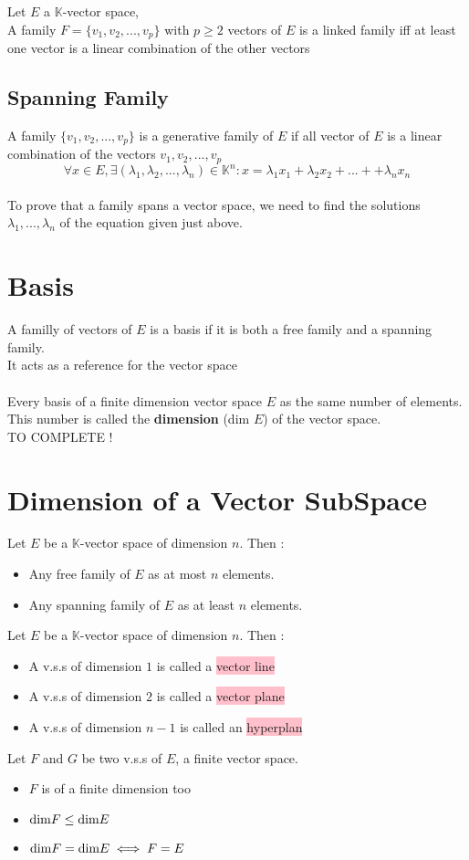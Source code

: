 \documentclass[notitlepage]{math}
\begin{document}
Let $E$ a $\mathbb{K}$-vector space,\\
A family $F = \{v_1,v_2,...,v_p\}$  with $p \geq 2$ vectors of $E$ is a linked family iff at least one vector is a linear combination of the other vectors

\subsection{Spanning Family}
A family $\{v_1,v_2,...,v_p\} $ is a generative family of $E$ if all vector of $E$ is a linear combination of the vectors $v_1,v_2,...,v_p$ \\
\[\forall x \in E, \exists (\lambda_1,\lambda_2,...,\lambda_n) \in \mathbb{K}^n: x =\lambda_1x_1 + \lambda_2x_2 + ... + + \lambda_nx_n\]\\
To prove that a family spans a vector space, we need to find the solutions $\lambda_1,...,\lambda_n$ of the equation given just above.

\section{Basis}
A familly of vectors of $E$ is a basis if it is both a free family and a spanning family.\\
It acts as a reference for the vector space\\\\
Every basis of a finite dimension vector space $E$ as the same number of elements. This number is called the \textbf{dimension} (dim $E$) of the vector space.\\
TO COMPLETE !
\section{Dimension of a Vector SubSpace}
Let $E$ be a $\mathbb{K}$-vector space of dimension $n$. Then :
\begin{itemize}
    \item Any free family of $E$ as at most $n$ elements.
    \item Any spanning family of $E$ as at least $n$ elements.
\end{itemize}
Let $E$ be a $\mathbb{K}$-vector space of dimension $n$. Then :
\begin{itemize}
    \item A v.s.s of dimension $1$ is called a \colorbox{pink}{vector line}
    \item A v.s.s of dimension $2$ is called a \colorbox{pink}{vector plane}
    \item A v.s.s of dimension $n-1$ is called an \colorbox{pink}{hyperplan}
\end{itemize}
Let $F$ and $G$ be two v.s.s of $E$, a finite vector space.
\begin{itemize}
    \item $F$ is of a finite dimension too
    \item $\text{dim}\space F \leq \text{dim}\space E$
    \item $\text{dim}\space F = \text{dim}\space E \iff F = E$
\end{itemize}
\end{document}
